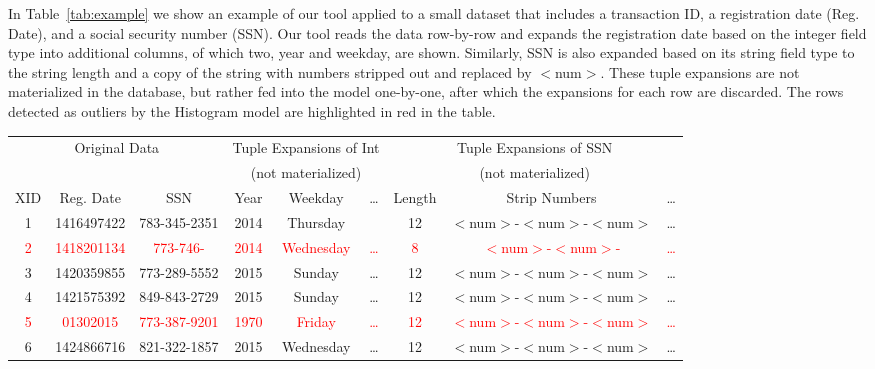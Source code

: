 In Table~\ref{tab:example} we show an example of our tool applied to a small dataset that includes a transaction ID, a registration date (Reg. Date), and a social security number (SSN).
Our tool reads the data row-by-row and expands the registration date based on the integer field type into additional columns, of which two, year and weekday, are shown.
Similarly, SSN is also expanded based on its string field type to the string length and a copy of the string with numbers stripped out and replaced by $<$num$>$.
These tuple expansions are not materialized in the database, but rather fed into the model one-by-one, after which the expansions for each row are discarded.
The rows detected as outliers by the Histogram model are highlighted in red in the table. 

\begin{table*}[t]
\begin{center}
\begin{tabular}{|c|c|c||c|c|c||c|c|c|}
\multicolumn{3}{c}{Original Data} & \multicolumn{3}{c}{Tuple Expansions of Int} & \multicolumn{3}{c}{Tuple Expansions of SSN} \\
\multicolumn{3}{c}{} & \multicolumn{3}{c}{(not materialized)} & \multicolumn{3}{c}{(not materialized)} \\
\hline
XID & Reg. Date & SSN & Year & Weekday & \ldots & Length & Strip Numbers & \ldots \\ \hline
1 & 1416497422 & 783-345-2351 & 2014 & Thursday && 12 & $<$num$>$-$<$num$>$-$<$num$>$ &\ldots  \\ \hline
\textcolor{red}{2} &\textcolor{red}{ 1418201134 }&\textcolor{red}{ 773-746- }&\textcolor{red}{ 2014  }&\textcolor{red}{ Wednesday }&\textcolor{red}{\ldots}&\textcolor{red}{ 8 }&\textcolor{red}{ $<$num$>$-$<$num$>$- }&\textcolor{red}{\ldots}  \\ \hline
3 & 1420359855 & 773-289-5552 & 2015  & Sunday &\ldots& 12 & $<$num$>$-$<$num$>$-$<$num$>$ &\ldots  \\ \hline
4 & 1421575392 & 849-843-2729 & 2015 & Sunday &\ldots& 12 & $<$num$>$-$<$num$>$-$<$num$>$ &  \ldots\\ \hline
\textcolor{red}{5 }&\textcolor{red}{ 01302015 }&\textcolor{red}{ 773-387-9201 }&\textcolor{red}{ 1970 }&\textcolor{red}{ Friday }&\textcolor{red}{\ldots}&\textcolor{red}{ 12 }&\textcolor{red}{ $<$num$>$-$<$num$>$-$<$num$>$ }&\textcolor{red}{  \ldots}\\ \hline
6 & 1424866716 & 821-322-1857 & 2015 & Wednesday &\ldots& 12 & $<$num$>$-$<$num$>$-$<$num$>$ &  \ldots\\ \hline

\end{tabular}
\end{center}
\end{table*}
